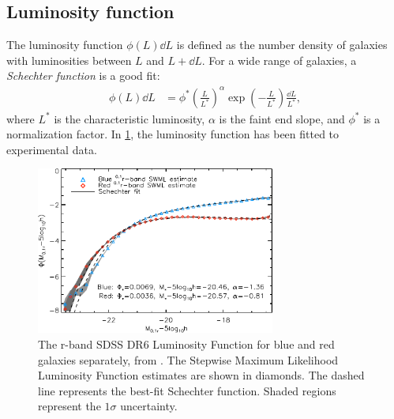 \subsection{Luminosity function}
The luminosity function $\phi(L) \dd{L}$ is defined as the number density of galaxies with luminosities between $L$ and $L + \dd{L}$.
For a wide range of galaxies, a \emph{Schechter function} is a good fit:
\begin{align*}
	\phi(L) \dd{L}
	&= \phi^* \left( \frac{L}{L^*} \right)^\alpha
	\exp\left( - \frac{L}{L^*} \right)
	\frac{\dd{L}}{L^*},
\end{align*}
where
$L^*$ is the characteristic luminosity,
$\alpha$ is the faint end slope,
and $\phi^*$ is a normalization factor.
In \cref{fig:lum-func}, the luminosity function has been fitted to experimental data.
\begin{figure}
	\includegraphics[width=0.7\textwidth]{img/ch-05/luminosity-function.pdf}
	\caption{The r-band SDSS DR6 Luminosity Function for blue and red galaxies separately, from \cite{Montero_Dorta_2009}. The Stepwise Maximum Likelihood Luminosity Function estimates are shown in diamonds. The dashed line represents the best-fit Schechter function. Shaded regions represent the $1 \sigma$ uncertainty.}
	\label{fig:lum-func}
\end{figure}

